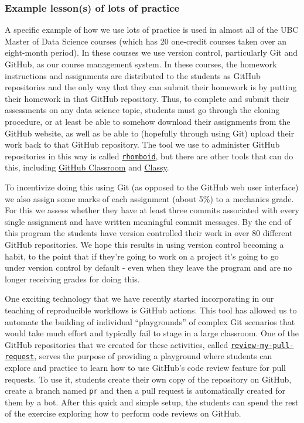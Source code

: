 \documentclass[
  12 pt,
]{paper}
\begin{document}
\hypertarget{example-lessons-of-lots-of-practice}{%
\subsubsection{Example lesson(s) of lots of practice}\label{example-lessons-of-lots-of-practice}}

A specific example of how we use lots of practice
is used in almost all of the UBC Master of Data Science courses
(which has 20 one-credit courses taken over an eight-month period).
In these courses we use version control,
particularly Git and GitHub, as our course management system.
In these courses, the homework instructions and assignments are distributed
to the students as GitHub repositories and the only way that they can submit
their homework is by putting their homework in that GitHub repository.
Thus, to complete and submit their assessments
on any data science topic, students must go through the cloning procedure,
or at least be able to somehow download their assignments from the
GitHub website, as well as be able to
(hopefully through using Git) upload their work back to that GitHub
repository. The tool we use to administer GitHub repositories in this way
is called \href{https://github.com/mgelbart/rhomboid}{\texttt{rhomboid}},
but there are other tools that can do this,
including \href{https://classroom.github.com/}{GitHub Classroom}
and \href{https://github.com/ubccpsc/classy}{Classy}.

To incentivize doing this using Git
(as opposed to the GitHub web user interface)
we also assign some marks of each assignment (about 5\%) to a mechanics grade.
For this we assess whether they have at least three
commits associated with every single assignment
and have written meaningful commit messages.
By the end of this program the students have version controlled their
work in over 80 different GitHub repositories.
We hope this results in using version control becoming a habit,
to the point that if they're going to work on a project
it's going to go under version control by default -
even when they leave the program
and are no longer receiving grades for doing this.

One exciting technology that we have recently started incorporating
in our teaching of reproducible workflows is GitHub actions.
This tool has allowed us
to automate the building of individual ``playgrounds'' of complex Git scenarios
that would take much effort and typically fail to stage in a large classroom.
One of the GitHub repositories that we created for these activities, called
\href{https://github.com/ttimbers/review-my-pull-request}{\texttt{review-my-pull-request}},
serves the purpose of providing a playground
where students can explore and practice
to learn how to use GitHub's code review feature for pull requests.
To use it,
students create their own copy of the repository on GitHub,
create a branch named \texttt{pr}
and then a pull request is automatically created for them by a bot.
After this quick and simple setup,
the students can spend the rest of the exercise
exploring how to perform code reviews on GitHub.
\end{document}
